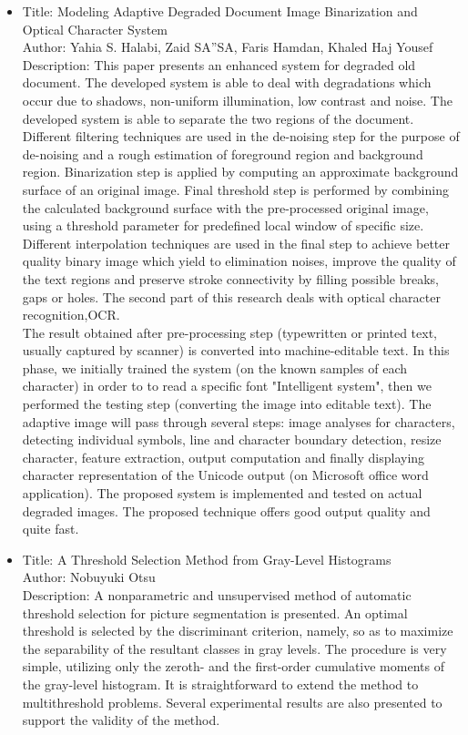 \documentclass[oneside,a4paper,12pt]{report}
\begin{document}
\begin{itemize}
\item Title: Modeling Adaptive Degraded Document Image Binarization and Optical Character System\\
Author: Yahia S. Halabi, Zaid SA”SA, Faris Hamdan, Khaled Haj Yousef\\
Description: This paper presents an enhanced system for degraded old document. The developed system is able to deal with degradations which occur due to shadows, non-uniform
illumination, low contrast and noise. The developed system is able to separate the two regions of the document. Different filtering techniques are used in the de-noising step for
the purpose of de-noising and a rough estimation of foreground region and background region. Binarization step is applied by computing an approximate background surface of an original image. Final threshold step is performed by combining the calculated background surface with the pre-processed original image, using a threshold parameter for predefined local window of specific size. Different interpolation techniques are used in the final step to achieve better quality binary image which yield to elimination noises, improve the quality of the text regions and preserve stroke connectivity by filling possible breaks, gaps or holes. The second part of this research deals with optical character recognition,OCR.\\
The result obtained after pre-processing step (typewritten or printed text, usually captured by scanner) is converted into machine-editable text. In this phase, we initially trained the
system (on the known samples of each character) in order to to read a specific font "Intelligent system", then we performed the testing step (converting the image into editable text). The adaptive image will pass through several steps: image analyses for characters, detecting individual symbols, line and character boundary detection, resize character, feature extraction, output computation and finally displaying character representation of the Unicode output (on Microsoft office word application). The proposed system is implemented and tested on actual degraded images. The proposed technique offers good output quality and quite fast.\\

\item Title: A Threshold Selection Method from Gray-Level Histograms \\
Author: Nobuyuki Otsu\\
Description: A nonparametric and unsupervised method of automatic threshold selection for picture segmentation is presented. An optimal threshold is selected by the discriminant criterion, namely, so as to maximize the separability of the resultant classes in gray levels. The procedure is very simple, utilizing only the zeroth- and the
first-order cumulative moments of the gray-level histogram. It is straightforward to extend the method to multithreshold problems. Several experimental results are also presented to support the validity of the method.\\


\end{itemize}
\end{document}
